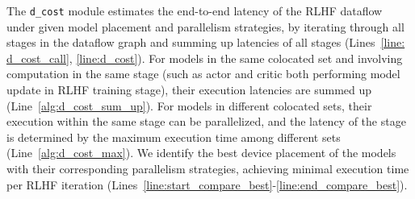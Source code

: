 The \verb|d_cost| module estimates the end-to-end latency of the RLHF dataflow under given model placement and %
parallelism strategies, by iterating through all stages in the dataflow graph and summing up latencies of all stages (Lines~\ref{line: d_cost_call}, \ref{line:d_cost}). %
For models in the same colocated set and involving computation in the same stage (such as actor and critic both performing model update in RLHF training stage),
their execution latencies are summed up (Line~\ref{alg:d_cost_sum_up}). For models in different colocated sets, their execution within the same stage can be parallelized, and the latency of the stage is determined by the maximum execution time among different sets (Line~\ref{alg:d_cost_max}). 
We identify the best device placement of the models with their corresponding parallelism strategies, achieving minimal execution time per RLHF iteration 
(Lines~\ref{line:start_compare_best}-\ref{line:end_compare_best}).

